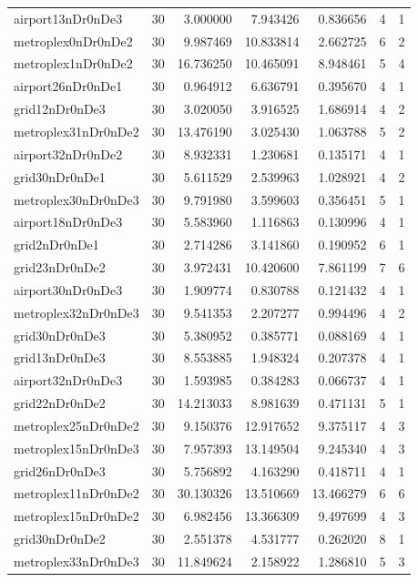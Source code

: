 \documentclass[../../../thesis.tex]{subfiles}
\begin{document}
\begin{longtable}{|l|r|r|r|r|r|r|}
airport13nDr0nDe3 & 30 & 3.000000 & 7.943426 & 0.836656 & 4 & 1 \\
metroplex0nDr0nDe2 & 30 & 9.987469 & 10.833814 & 2.662725 & 6 & 2 \\
metroplex1nDr0nDe2 & 30 & 16.736250 & 10.465091 & 8.948461 & 5 & 4 \\
airport26nDr0nDe1 & 30 & 0.964912 & 6.636791 & 0.395670 & 4 & 1 \\
grid12nDr0nDe3 & 30 & 3.020050 & 3.916525 & 1.686914 & 4 & 2 \\
metroplex31nDr0nDe2 & 30 & 13.476190 & 3.025430 & 1.063788 & 5 & 2 \\
airport32nDr0nDe2 & 30 & 8.932331 & 1.230681 & 0.135171 & 4 & 1 \\
grid30nDr0nDe1 & 30 & 5.611529 & 2.539963 & 1.028921 & 4 & 2 \\
metroplex30nDr0nDe3 & 30 & 9.791980 & 3.599603 & 0.356451 & 5 & 1 \\
airport18nDr0nDe3 & 30 & 5.583960 & 1.116863 & 0.130996 & 4 & 1 \\
grid2nDr0nDe1 & 30 & 2.714286 & 3.141860 & 0.190952 & 6 & 1 \\
grid23nDr0nDe2 & 30 & 3.972431 & 10.420600 & 7.861199 & 7 & 6 \\
airport30nDr0nDe3 & 30 & 1.909774 & 0.830788 & 0.121432 & 4 & 1 \\
metroplex32nDr0nDe3 & 30 & 9.541353 & 2.207277 & 0.994496 & 4 & 2 \\
grid30nDr0nDe3 & 30 & 5.380952 & 0.385771 & 0.088169 & 4 & 1 \\
grid13nDr0nDe3 & 30 & 8.553885 & 1.948324 & 0.207378 & 4 & 1 \\
airport32nDr0nDe3 & 30 & 1.593985 & 0.384283 & 0.066737 & 4 & 1 \\
grid22nDr0nDe2 & 30 & 14.213033 & 8.981639 & 0.471131 & 5 & 1 \\
metroplex25nDr0nDe2 & 30 & 9.150376 & 12.917652 & 9.375117 & 4 & 3 \\
metroplex15nDr0nDe3 & 30 & 7.957393 & 13.149504 & 9.245340 & 4 & 3 \\
grid26nDr0nDe3 & 30 & 5.756892 & 4.163290 & 0.418711 & 4 & 1 \\
metroplex11nDr0nDe2 & 30 & 30.130326 & 13.510669 & 13.466279 & 6 & 6 \\
metroplex15nDr0nDe2 & 30 & 6.982456 & 13.366309 & 9.497699 & 4 & 3 \\
grid30nDr0nDe2 & 30 & 2.551378 & 4.531777 & 0.262020 & 8 & 1 \\
metroplex33nDr0nDe3 & 30 & 11.849624 & 2.158922 & 1.286810 & 5 & 3 \\

\end{longtable}
\end{document}

